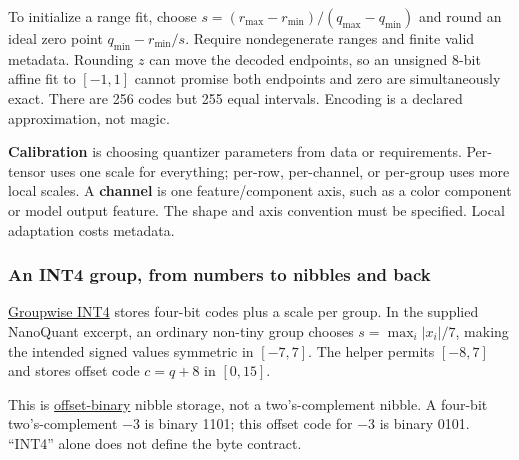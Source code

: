 To initialize a range fit, choose \(s=(r_{\max}-r_{\min})/(q_{\max}-q_{\min})\) and round an ideal zero point \(q_{\min}-r_{\min}/s\). Require nondegenerate ranges and finite valid metadata. Rounding \(z\) can move the decoded endpoints, so an unsigned 8-bit affine fit to \([-1,1]\) cannot promise both endpoints and zero are simultaneously exact. There are 256 codes but 255 equal intervals. Encoding is a declared approximation, not magic.

\textbf{Calibration} is choosing quantizer parameters from data or requirements. Per-tensor uses one scale for everything; per-row, per-channel, or per-group uses more local scales. A \textbf{channel} is one feature/component axis, such as a color component or model output feature. The shape and axis convention must be specified. Local adaptation costs metadata.

\subsubsection{An INT4 group, from numbers to nibbles and back}\label{01-foundations-i-ch001-an-int4-group-from-numbers-to-nibbles-and-back}

\hypertarget{01-foundations-i-ch001-an-int4-group-from-numbers-to-nibbles-and-back}{}

\hyperref[appendix-638204c40e8b]{Groupwise INT4} stores four-bit codes plus a scale per group. In the supplied NanoQuant excerpt, an ordinary non-tiny group chooses \(s=\max_i|x_i|/7\), making the intended signed values symmetric in \([-7,7]\). The helper permits \([-8,7]\) and stores offset code \(c=q+8\) in \([0,15]\).

This is \hyperref[appendix-53a8cfb25f8d]{offset-binary} nibble storage, not a two's-complement nibble. A four-bit two's-complement −3 is binary 1101; this offset code for −3 is binary 0101. ``INT4'' alone does not define the byte contract.

